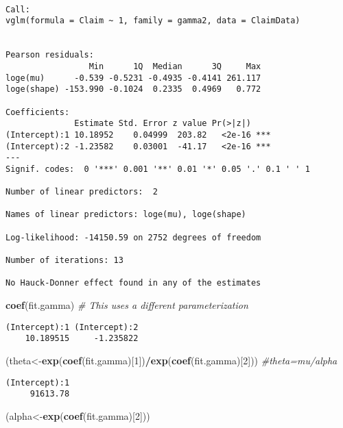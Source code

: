 \documentclass[]{book}
\newenvironment{Shaded}{\begin{snugshade}}{\end{snugshade}}
\newcommand{\KeywordTok}[1]{\textcolor[rgb]{0.13,0.29,0.53}{\textbf{#1}}}
\newcommand{\DecValTok}[1]{\textcolor[rgb]{0.00,0.00,0.81}{#1}}
\newcommand{\CommentTok}[1]{\textcolor[rgb]{0.56,0.35,0.01}{\textit{#1}}}
\newcommand{\OperatorTok}[1]{\textcolor[rgb]{0.81,0.36,0.00}{\textbf{#1}}}
\newcommand{\NormalTok}[1]{#1}
\theoremstyle{definition}
\theoremstyle{definition}
\theoremstyle{definition}
\theoremstyle{remark}
\begin{document}
\begin{verbatim}

Call:
vglm(formula = Claim ~ 1, family = gamma2, data = ClaimData)


Pearson residuals:
                 Min      1Q  Median      3Q     Max
loge(mu)      -0.539 -0.5231 -0.4935 -0.4141 261.117
loge(shape) -153.990 -0.1024  0.2335  0.4969   0.772

Coefficients: 
              Estimate Std. Error z value Pr(>|z|)    
(Intercept):1 10.18952    0.04999  203.82   <2e-16 ***
(Intercept):2 -1.23582    0.03001  -41.17   <2e-16 ***
---
Signif. codes:  0 '***' 0.001 '**' 0.01 '*' 0.05 '.' 0.1 ' ' 1

Number of linear predictors:  2 

Names of linear predictors: loge(mu), loge(shape)

Log-likelihood: -14150.59 on 2752 degrees of freedom

Number of iterations: 13 

No Hauck-Donner effect found in any of the estimates
\end{verbatim}

\begin{Shaded}
\begin{Highlighting}[]
\KeywordTok{coef}\NormalTok{(fit.gamma)                 }\CommentTok{# This uses a different parameterization }
\end{Highlighting}
\end{Shaded}

\begin{verbatim}
(Intercept):1 (Intercept):2 
    10.189515     -1.235822 
\end{verbatim}

\begin{Shaded}
\begin{Highlighting}[]
\NormalTok{(theta<-}\KeywordTok{exp}\NormalTok{(}\KeywordTok{coef}\NormalTok{(fit.gamma)[}\DecValTok{1}\NormalTok{])}\OperatorTok{/}\KeywordTok{exp}\NormalTok{(}\KeywordTok{coef}\NormalTok{(fit.gamma)[}\DecValTok{2}\NormalTok{])) }\CommentTok{#theta=mu/alpha}
\end{Highlighting}
\end{Shaded}

\begin{verbatim}
(Intercept):1 
     91613.78 
\end{verbatim}

\begin{Shaded}
\begin{Highlighting}[]
\NormalTok{(alpha<-}\KeywordTok{exp}\NormalTok{(}\KeywordTok{coef}\NormalTok{(fit.gamma)[}\DecValTok{2}\NormalTok{]))}
\end{Highlighting}
\end{Shaded}
\end{document}
